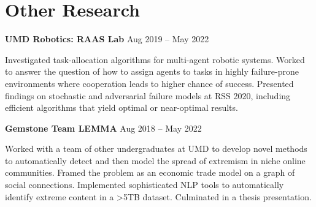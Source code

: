 \documentclass[letterpaper,11pt]{article}
\begin{document}
\section{Other Research}
\hspace{8pt}
\begin{minipage}[t]{0.46\textwidth}
    \textbf{UMD Robotics: RAAS Lab} \hspace{\fill} Aug 2019 -- May 2022
    
    \setlength{\parindent}{15pt}
    {\small Investigated task-allocation algorithms for multi-agent robotic systems. Worked to answer the question of how to assign agents to tasks in highly failure-prone environments where cooperation leads to higher chance of success. Presented findings on stochastic and adversarial failure models at RSS 2020, including efficient algorithms that yield optimal or near-optimal results.}
\end{minipage}
\hfill
\begin{minipage}[t]{0.46\textwidth}
    \textbf{Gemstone Team LEMMA} \hspace{\fill} Aug 2018 -- May 2022
    
    \setlength{\parindent}{15pt}
    {\small Worked with a team of other undergraduates at UMD to develop novel methods to automatically detect and then model the spread of extremism in niche online communities. Framed the problem as an economic trade model on a graph of social connections. Implemented sophisticated NLP tools to automatically identify extreme content in a >5TB dataset. Culminated in a thesis presentation.}
\end{minipage}
\hspace{8pt}
\end{document}
